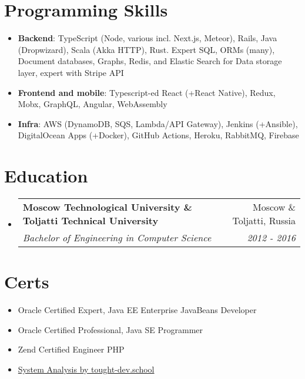\documentclass[letterpaper,10pt]{article}
\makeatletter
\newcommand{\resumeItem}[2]{
  \item\small{
    \textbf{#1}{: #2 \vspace{-2pt}}
  }
}
\newcommand{\resumeSubheading}[4]{
  \vspace{-1pt}\item
    \begin{tabular*}{0.97\textwidth}[t]{l@{\extracolsep{\fill}}r}
      \textbf{#1} & #2 \\
      \textit{\small#3} & \textit{\small #4} \\
    \end{tabular*}\vspace{-5pt}
}
\newcommand{\resumeSubItem}[2]{\resumeItem{#1}{#2}\vspace{-4pt}}
\newcommand{\resumeSubHeadingListStart}{\begin{itemize}[leftmargin=*]}
\newcommand{\resumeSubHeadingListEnd}{\end{itemize}}
\makeatother
\begin{document}

%
\section{Programming Skills}
  \resumeSubHeadingListStart
    \item{
      \textbf{Backend}{: TypeScript (Node, various incl. Next.js, Meteor), Rails, Java (Dropwizard), Scala (Akka HTTP), Rust. Expert SQL, ORMs (many), Document databases, Graphs, Redis, and Elastic Search for Data storage layer, expert with Stripe API}
      \hfill
    }
    \item{
      \textbf{Frontend and mobile}{: Typescript-ed React (+React Native), Redux, Mobx, GraphQL, Angular, WebAssembly}
      \hfill
    }
    \item{
      \textbf{Infra}{: AWS (DynamoDB, SQS, Lambda/API Gateway), Jenkins (+Ansible), DigitalOcean Apps (+Docker), GitHub Actions, Heroku, RabbitMQ, Firebase }
      \hfill
    }
  \resumeSubHeadingListEnd

\section{Education}
  \resumeSubHeadingListStart
    \resumeSubheading
      {Moscow Technological University \& Toljatti Technical University}{Moscow \& Toljatti, Russia}
      {Bachelor of Engineering in Computer Science}{2012 - 2016}
  \resumeSubHeadingListEnd

  \section{Certs}
    \resumeSubHeadingListStart
      \item
        {Oracle Certified Expert, Java EE Enterprise JavaBeans Developer}
      \item
        {Oracle Certified Professional, Java SE Programmer}
      \item
        {Zend Certified Engineer PHP}
      \item
        \href{https://cert.tough-dev.school/eS8vL3fj6ZMuKuBvqcpKQS/en}{System Analysis by tought-dev.school}
    \resumeSubHeadingListEnd


\end{document}
